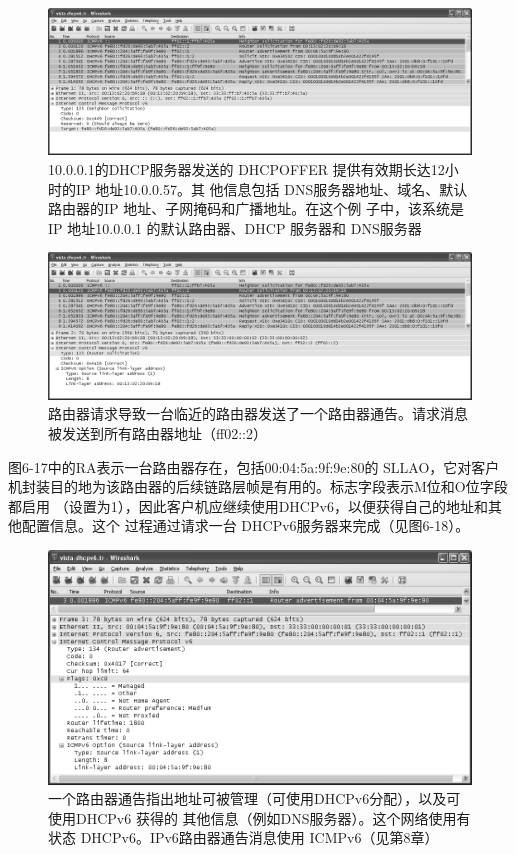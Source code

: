 \begin{figure}[H]
    \centering
	\includegraphics[scale=0.5]{imgs/6/6-15.png}
	\caption{10.0.0.1的DHCP服务器发送的 DHCPOFFER 提供有效期长达12小时的IP 地址10.0.0.57。其
    他信息包括 DNS服务器地址、域名、默认路由器的IP 地址、子网掩码和广播地址。在这个例
    子中，该系统是 IP 地址10.0.0.1 的默认路由器、DHCP 服务器和 DNS服务器}
\end{figure}


\begin{figure}[H]
    \centering
	\includegraphics[scale=0.5]{imgs/6/6-16.png}
	\caption{路由器请求导致一台临近的路由器发送了一个路由器通告。请求消息被发送到所有路由器地址（ff02::2）}
\end{figure}

图6-17中的RA表示一台路由器存在，包括00:04:5a:9f:9e:80的 SLLAO，它对客户
机封装目的地为该路由器的后续链路层帧是有用的。标志字段表示M位和O位字段都启用
（设置为1），因此客户机应继续使用DHCPv6，以便获得自己的地址和其他配置信息。这个
过程通过请求一台 DHCPv6服务器来完成（见图6-18）。

\begin{figure}[H]
    \centering
	\includegraphics[scale=0.5]{imgs/6/6-17.png}
	\caption{一个路由器通告指出地址可被管理（可使用DHCPv6分配），以及可使用DHCPv6 获得的
    其他信息（例如DNS服务器）。这个网络使用有状态 DHCPv6。IPv6路由器通告消息使用
    ICMPv6（见第8章）}
\end{figure}

